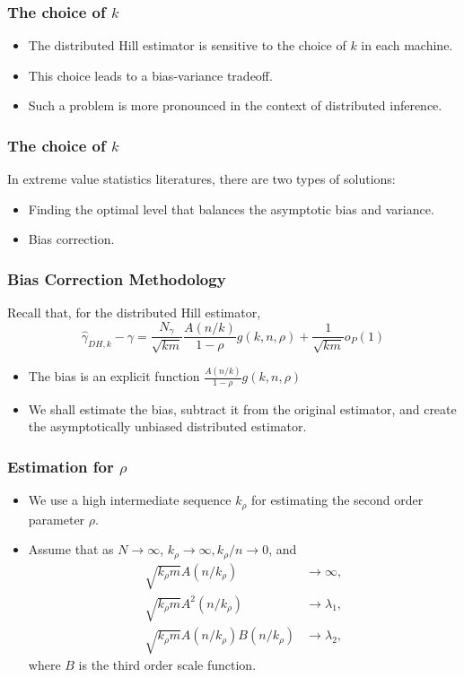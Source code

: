 \documentclass{beamer}
\begin{document}
\begin{frame}
    \frametitle{The choice of $k$}
\begin{itemize}

    \item The distributed Hill estimator is sensitive to the   choice of $k$ in each machine.
    \medskip
    \item This choice leads to a bias-variance tradeoff.
    \medskip
    \item Such a problem is more pronounced in the context of distributed inference.
\end{itemize}
    

\end{frame}

\begin{frame}
    \frametitle{The choice of $k$}
In extreme value statistics literatures, there are two types of solutions:
\bigskip
\begin{itemize}
    \item Finding the optimal level that balances the asymptotic bias and variance.
    
    \bigskip
    \item {\color{red} Bias correction.}
\end{itemize}
    

\end{frame}

\begin{frame}
    \frametitle{Bias Correction Methodology}

Recall that, for the distributed Hill estimator,
$$
\hat{\gamma}_{DH,k} -\gamma = \frac{N_{\gamma}}{\sqrt{km}}\frac{A(n/k)}{1-\rho}g(k,n,\rho)+\frac{1}{\sqrt{km}}o_P(1)
$$
    

\begin{itemize}
    \item The bias is an explicit function $\frac{A(n/k)}{1-\rho}g(k,n,\rho)$
    \medskip
    \item We shall estimate the bias, subtract it from the original estimator, and create the asymptotically unbiased distributed estimator.
\end{itemize}
\end{frame}


\begin{frame}
    \frametitle{Estimation for $\rho$}
\begin{itemize}
    \item We use a high intermediate sequence $k_{\rho}$ for estimating the second order parameter $\rho$.
    \medskip 
    \item Assume that as $N\to\infty$, $k_{\rho} \to\infty, k_{\rho}/n \to 0$, and 
    $$
  \begin{aligned}
    \sqrt{k_{\rho}m} A(n/k_{\rho})&\to\infty,\\
    \sqrt{k_{\rho}m} A^2(n/k_{\rho})&\to\lambda_1,\\
     \sqrt{k_{\rho}m} A(n/k_{\rho})B(n/k_{\rho})&\to\lambda_2,
  \end{aligned}
    $$
    where $B$ is the third order scale function.
\end{itemize}

\end{frame}
\end{document}
